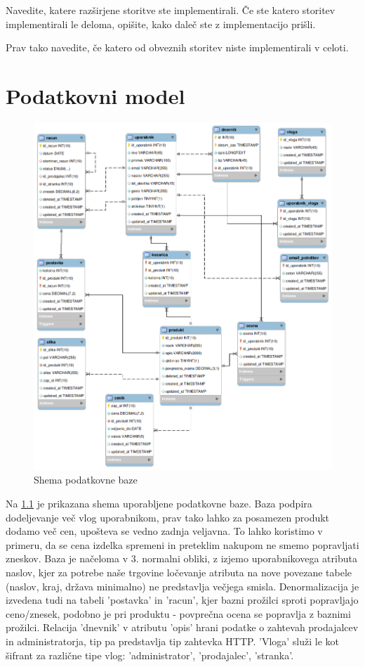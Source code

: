 \documentclass[a4paper,12pt]{report}
\begin{document}
Navedite, katere razširjene storitve ste implementirali. Če ste katero storitev implementirali le deloma, opišite, kako daleč ste z implementacijo prišli. 

Prav tako navedite, če katero od obveznih storitev niste implementirali v celoti.


\chapter{Podatkovni model}

\begin{figure}
    \centering
    \includegraphics[width=\textwidth]{slike/spletna_trgovina.png}
    \caption{Shema podatkovne baze}
    \label{fig:spletna_trgovina_db}
\end{figure}

Na \ref{fig:spletna_trgovina_db} je prikazana shema uporabljene podatkovne baze. Baza podpira dodeljevanje več vlog uporabnikom, prav tako lahko za posamezen produkt dodamo več cen, upošteva se vedno zadnja veljavna. To lahko koristimo v primeru, da se cena izdelka spremeni in preteklim nakupom ne smemo popravljati zneskov. Baza je načeloma v 3. normalni obliki, z izjemo uporabnikovega atributa naslov, kjer za potrebe naše trgovine ločevanje atributa na nove povezane tabele (naslov, kraj, država minimalno) ne predstavlja večjega smisla. Denormalizacija je izvedena tudi na tabeli 'postavka' in 'racun', kjer bazni prožilci sproti popravljajo ceno/znesek, podobno je pri produktu - povprečna ocena se popravlja z baznimi prožilci. 
Relacija 'dnevnik' v atributu 'opis' hrani podatke o zahtevah prodajalcev in administratorja, tip pa predstavlja tip zahtevka HTTP. 'Vloga' služi le kot šifrant za različne tipe vlog: 'administrator', 'prodajalec', 'stranka'.
\end{document}
